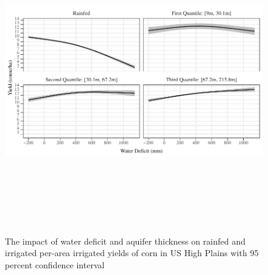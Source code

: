 \documentclass[
]{article}
\begin{document}
\begin{figure}[H]

{\centering \includegraphics[width=6in,height=500px,]{Figures/g_yield_with_conf_corn} 

}

\caption{The impact of water deficit and aquifer thickness on rainfed and irrigated per-area irrigated yields of corn in US High Plains with 95 percent confidence interval}\label{fig:irrigated-yield-ind-corn}
\end{figure}
\end{document}
